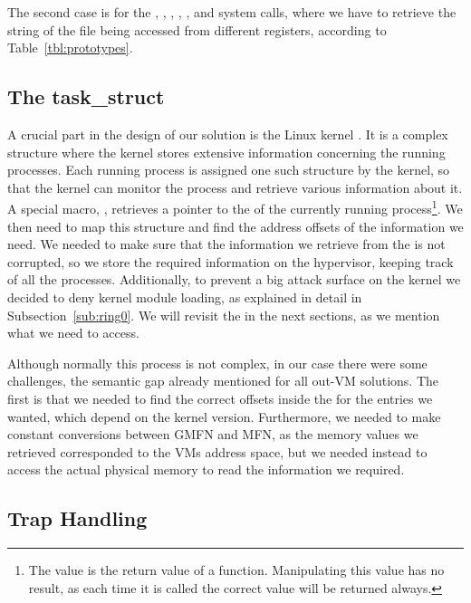 \par The second case is for the , , , , , and  system calls, where we have to retrieve the string of the file being accessed from different registers, according to Table~\ref{tbl:prototypes}. 




\subsection{The task\_struct}\label{sub:struct}
\par A crucial part in the design of our solution is the Linux kernel . It is a complex structure where the kernel stores extensive information concerning the running processes. Each running process is assigned one such structure by the kernel, so that the kernel can monitor the process and retrieve various information about it. A special macro, , retrieves a pointer to the  of the currently running process\footnote{The value is the return value of a function. Manipulating this value has no result, as each time it is called the correct value will be returned always.}. We then need to map this structure and find the address offsets of the information we need. We needed to make sure that the information we retrieve from the  is not corrupted, so we store the required information on the hypervisor, keeping track of all the processes. Additionally, to prevent a big attack surface on the kernel we decided to deny kernel module loading, as explained in detail in Subsection~\ref{sub:ring0}. We will revisit the  in the next sections, as we mention what we need to access.

\par Although normally this process is not complex, in our case there were some challenges, the semantic gap already mentioned for all out-\ac{VM} solutions. The first is that we needed to find the correct offsets inside the  for the entries we wanted, which depend on the kernel version. Furthermore, we needed to make constant conversions between \ac{GMFN} and \ac{MFN}, as the memory values we retrieved corresponded to the \ac{VM}s address space, but we needed instead to access the actual physical memory to read the information we required.


\subsection{Trap Handling}\label{sub:handling}

